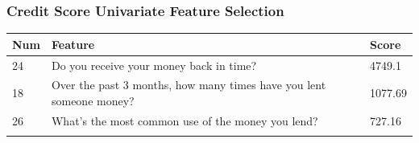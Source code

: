\hypertarget{credit-score-univariate-feature-selection}{%
\subsubsection{Credit Score Univariate Feature
Selection}\label{credit-score-univariate-feature-selection}}

\begin{longtable}[]{@{}lll@{}}
\toprule
\begin{minipage}[b]{0.05\columnwidth}\raggedright
Num\strut
\end{minipage} & \begin{minipage}[b]{0.77\columnwidth}\raggedright
Feature\strut
\end{minipage} & \begin{minipage}[b]{0.09\columnwidth}\raggedright
Score\strut
\end{minipage}\tabularnewline
\midrule
\endhead
\begin{minipage}[t]{0.05\columnwidth}\raggedright
24\strut
\end{minipage} & \begin{minipage}[t]{0.77\columnwidth}\raggedright
Do you receive your money back in time?\strut
\end{minipage} & \begin{minipage}[t]{0.09\columnwidth}\raggedright
4749.1\strut
\end{minipage}\tabularnewline
\begin{minipage}[t]{0.05\columnwidth}\raggedright
18\strut
\end{minipage} & \begin{minipage}[t]{0.77\columnwidth}\raggedright
Over the past 3 months, how many times have you lent someone
money?\strut
\end{minipage} & \begin{minipage}[t]{0.09\columnwidth}\raggedright
1077.69\strut
\end{minipage}\tabularnewline
\begin{minipage}[t]{0.05\columnwidth}\raggedright
26\strut
\end{minipage} & \begin{minipage}[t]{0.77\columnwidth}\raggedright
What's the most common use of the money you lend?\strut
\end{minipage} & \begin{minipage}[t]{0.09\columnwidth}\raggedright
727.16\strut
\end{minipage}\tabularnewline
\begin{minipage}[t]{0.05\columnwidth}\raggedright

\end{minipage}
\end{longtable}
